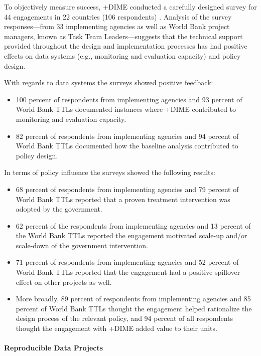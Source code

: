\documentclass[
]{WileySix}
\providecommand{\tightlist}{%
  \setlength{\itemsep}{0pt}\setlength{\parskip}{0pt}}
\begin{document}
To objectively measure success, +DIME\textbar{} conducted a carefully designed survey for 44 engagements in 22 countries (106 respondents) \citep{legovini}. Analysis of the survey responses---from 33 implementing agencies as well as World Bank project managers, known as Task Team Leaders---suggests that the technical support provided throughout the design and implementation processes has had positive effects on data systems (e.g., monitoring and evaluation capacity) and policy design.

With regards to data systems the surveys showed positive feedback:

\begin{itemize}
\tightlist
\item
  100 percent of respondents from implementing agencies and 93 percent of World Bank TTLs documented instances where +DIME\textbar{} contributed to monitoring and evaluation capacity.
\item
  82 percent of respondents from implementing agencies and 94 percent of World Bank TTLs documented how the baseline analysis contributed to policy design.
\end{itemize}

In terms of policy influence the surveys showed the following results:

\begin{itemize}
\tightlist
\item
  68 percent of respondents from implementing agencies and 79 percent of World Bank TTLs reported that a proven treatment intervention was adopted by the government.
\item
  62 percent of the respondents from implementing agencies and 13 percent of the World Bank TTLs reported the engagement motivated scale-up and/or scale-down of the government intervention.
\item
  71 percent of respondents from implementing agencies and 52 percent of World Bank TTLs reported that the engagement had a positive spillover effect on other projects as well.
\item
  More broadly, 89 percent of respondents from implementing agencies and 85 percent of World Bank TTLs thought the engagement helped rationalize the design process of the relevant policy, and 94 percent of all respondents thought the engagement with +DIME\textbar{} added value to their units.
\end{itemize}

\hypertarget{reproducible-data-projects}{%
\paragraph{Reproducible Data Projects}\label{reproducible-data-projects}}
\end{document}

